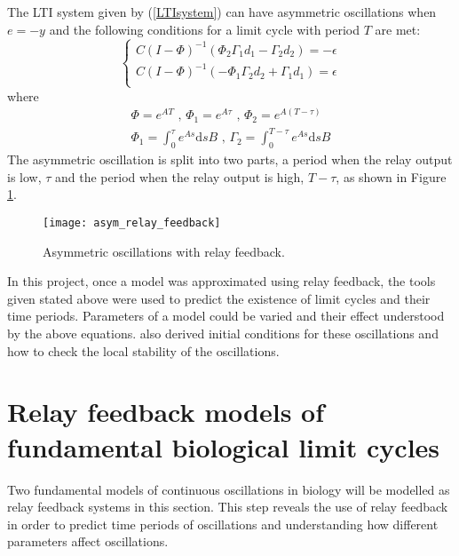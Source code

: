 \documentclass[a4paper, 12pt]{article}
\begin{document}
The LTI system given by (\ref{LTIsystem}) can have asymmetric oscillations when $e=-y$ and the following conditions for a limit cycle with period $T$ are met:
\begin{equation}
\begin{cases}
C(I-\Phi)^{-1}(\Phi_2\Gamma_1d_1-\Gamma_2d_2) = -\epsilon \\
C(I-\Phi)^{-1}(-\Phi_1\Gamma_2d_2+\Gamma_1d_1) = \epsilon \\
\end{cases}
 \label{eqtn5_2}
\end{equation}
where
\begin{equation}
\begin{array}{l}
\displaystyle \Phi = e^{AT}  \text{  ,  }\Phi_1 = e^{A\tau} \text{  ,  }  \Phi_2 = e^{A(T-\tau)} \\
\displaystyle \Phi_1 = \int_0^\tau e^{As}\text{d}sB \text{  ,  } \Gamma_2 = \int_0^{T-\tau}e^{As}\text{d}sB
\end{array}
\end{equation}
The asymmetric oscillation is split into two parts, a period when the relay output is low, $\tau$ and the period when the relay output is high, $T-\tau$, as shown in Figure \ref{fig:asym_relay_oscillations}.

\begin{figure}
\texttt{[image: asym\_relay\_feedback]}
\caption{Asymmetric oscillations with relay feedback.}
\label{fig:asym_relay_oscillations}
\end{figure}

In this project, once a model was approximated using relay feedback, the tools given stated above were used to predict the existence of limit cycles and their time periods. Parameters of a model could be varied and their effect understood by the above equations. \cite{astrom1995} also derived initial conditions for these oscillations and how to check the local stability of the oscillations.

\FloatBarrier
\section{Relay feedback models of fundamental biological limit cycles}\label{Sec:continous oscillations}
Two fundamental models of continuous oscillations in biology will be modelled as relay feedback systems in this section. This step reveals the use of relay feedback in order to predict time periods of oscillations and understanding how different parameters affect oscillations. 
\end{document}
